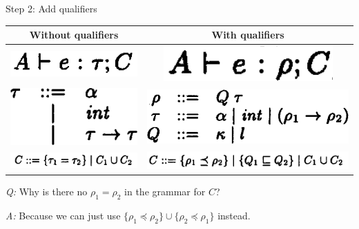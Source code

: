 \documentclass{beamer}
\begin{document}
\begin{frame}{Step 2: Add qualifiers}

\renewcommand{\arraystretch}{1.5}
\begin{tabular}{c | c}
Without qualifiers & With qualifiers \\
\hline
\includegraphics[scale=0.7]{paper_constraint_judgment.png} & \includegraphics[scale=0.55]{paper_constraint_judgment_qualifs.png}\\
\hline  
\includegraphics[scale=0.55]{paper_figure_1_tau.png} & \includegraphics[scale=0.55]{paper_figure_3_no_label.png} \\
\hline
\includegraphics[scale=0.7]{paper_constraint_grammar.png} & \includegraphics[scale=0.55]{paper_constraint_grammar_qualifs.png}\\
\hline
\end{tabular}
\renewcommand{\arraystretch}{1.0}

\bigskip
\pause

\textit{Q:} Why is there no $\rho_1 = \rho_2$ in the grammar for $C$?

\pause

\textit{A:} Because we can just use $\{\rho_1 \preceq \rho_2\} \cup \{\rho_2 \preceq \rho_1 \}$ instead.

\end{frame}
\end{document}
